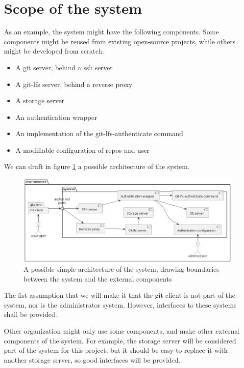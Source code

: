 \section{Scope of the system}

As an example, the system might have the following components. Some components might be reused from existing open-source projects, while others might be developed from scratch.

\begin{itemize}
    \item A git server, behind a ssh server
    \item A git-lfs server, behind a reverse proxy
    \item A storage server
    \item An authentication wrapper
    \item An implementation of the git-lfs-authenticate command
    \item A modifiable configuration of repos and user
\end{itemize}

We can draft in figure \ref{fig:architecture} a possible architecture of the system.

\begin{figure}[h]
    \centering
    \includegraphics[width=\textwidth]{iteration_00/diagrams/context.png}
    \caption{A possible simple architecture of the system, drawing boundaries between the system and the external components}
    \label{fig:architecture}
\end{figure}

The fist assumption that we will make it that the git client is not part of the system, nor is the administrator system. However, interfaces to these systems shall be provided.

Other organization might only use some components, and make other external components of the system. For example, the storage server will be considered part of the system for this project, but it should be easy to replace it with another storage server, so good interfaces will be provided.
